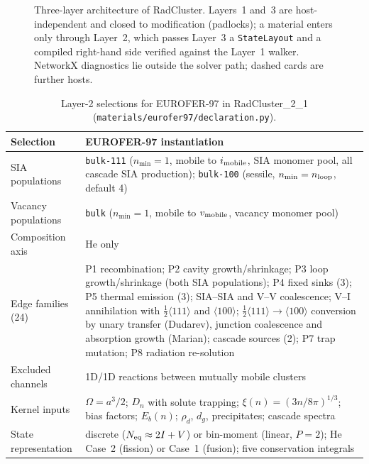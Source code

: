 \begin{figure}[p]
\centering

\caption{Three-layer architecture of RadCluster. Layers~1 and~3 are
host-independent and closed to modification (padlocks); a material enters
only through Layer~2, which passes Layer~3 a \texttt{StateLayout} and a
compiled right-hand side verified against the Layer~1 walker. NetworkX
diagnostics lie outside the solver path; dashed cards are further hosts.}
\label{fig:S1_arch}
\end{figure}

\begin{table}[t]
\centering
\caption{Layer-2 selections for EUROFER-97 in RadCluster\_2\_1
(\texttt{materials/eurofer97/declaration.py}).}
\label{tab:S1_layer2}
\small
\begin{tabularx}{\textwidth}{@{}p{}X@{}}
\toprule
Selection & EUROFER-97 instantiation \\
\midrule
SIA populations & \texttt{bulk-111} ($n_{\min}=1$, mobile to $i_{\rm mobile}$, SIA monomer pool, all cascade SIA production);
                  \texttt{bulk-100} (sessile, $n_{\min}=n_{\rm loop}$, default 4) \\
Vacancy populations & \texttt{bulk} ($n_{\min}=1$, mobile to $v_{\rm mobile}$, vacancy monomer pool) \\
Composition axis & He only \\
Edge families (24) & P1 recombination; P2 cavity growth/shrinkage; P3 loop growth/shrinkage (both SIA populations);
  P4 fixed sinks (3); P5 thermal emission (3); SIA--SIA and V--V coalescence; V--I annihilation with
  $\tfrac12\langle111\rangle$ and $\langle100\rangle$; $\tfrac12\langle111\rangle\to\langle100\rangle$
  conversion by unary transfer (Dudarev), junction coalescence and absorption growth (Marian);
  cascade sources (2); P7 trap mutation; P8 radiation re-solution \\
Excluded channels & 1D/1D reactions between mutually mobile clusters \\
Kernel inputs & $\Omega=a^3/2$; $D_n$ with solute trapping; $\xi(n)=(3n/8\pi)^{1/3}$; bias factors; $E_b(n)$; $\rho_d$, $d_g$, precipitates; cascade spectra \\
State representation & discrete ($N_{\rm eq}\approx 2I+V$) or bin-moment (linear, $P=2$); He Case~2 (fission) or Case~1 (fusion); five conservation integrals \\
\bottomrule
\end{tabularx}
\end{table}

